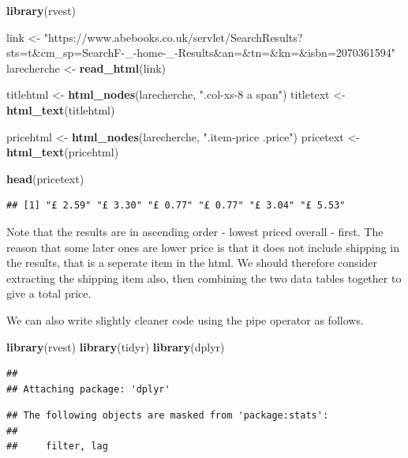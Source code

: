 \documentclass[]{book}
\newenvironment{Shaded}{\begin{snugshade}}{\end{snugshade}}
\newcommand{\KeywordTok}[1]{\textcolor[rgb]{0.13,0.29,0.53}{\textbf{#1}}}
\newcommand{\StringTok}[1]{\textcolor[rgb]{0.31,0.60,0.02}{#1}}
\newcommand{\NormalTok}[1]{#1}
\theoremstyle{definition}
\theoremstyle{definition}
\theoremstyle{definition}
\theoremstyle{remark}
\begin{document}
\begin{Shaded}
\begin{Highlighting}[]
\KeywordTok{library}\NormalTok{(rvest)}

\NormalTok{link <-}\StringTok{ "https://www.abebooks.co.uk/servlet/SearchResults?sts=t&cm_sp=SearchF-_-home-_-Results&an=&tn=&kn=&isbn=2070361594"}
\NormalTok{larecherche <-}\StringTok{ }\KeywordTok{read_html}\NormalTok{(link)}

\NormalTok{titlehtml <-}\StringTok{ }\KeywordTok{html_nodes}\NormalTok{(larecherche, }\StringTok{".col-xs-8 a span"}\NormalTok{)}
\NormalTok{titletext <-}\StringTok{ }\KeywordTok{html_text}\NormalTok{(titlehtml)}

\NormalTok{pricehtml <-}\StringTok{ }\KeywordTok{html_nodes}\NormalTok{(larecherche, }\StringTok{".item-price .price"}\NormalTok{)}
\NormalTok{pricetext <-}\StringTok{ }\KeywordTok{html_text}\NormalTok{(pricehtml)}

\KeywordTok{head}\NormalTok{(pricetext)}
\end{Highlighting}
\end{Shaded}

\begin{verbatim}
## [1] "£ 2.59" "£ 3.30" "£ 0.77" "£ 0.77" "£ 3.04" "£ 5.53"
\end{verbatim}

Note that the results are in ascending order - lowest priced overall -
first. The reason that some later ones are lower price is that it does
not include shipping in the results, that is a seperate item in the
html. We should therefore consider extracting the shipping item also,
then combining the two data tables together to give a total price.

We can also write slightly cleaner code using the pipe operator as
follows.

\begin{Shaded}
\begin{Highlighting}[]
\KeywordTok{library}\NormalTok{(rvest)}
\KeywordTok{library}\NormalTok{(tidyr)}
\KeywordTok{library}\NormalTok{(dplyr)}
\end{Highlighting}
\end{Shaded}

\begin{verbatim}
## 
## Attaching package: 'dplyr'
\end{verbatim}

\begin{verbatim}
## The following objects are masked from 'package:stats':
## 
##     filter, lag
\end{verbatim}
\end{document}
